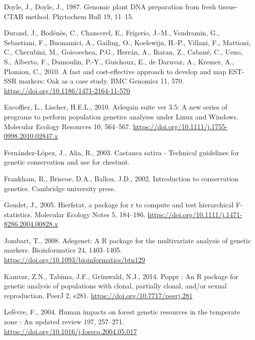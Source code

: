 \documentclass[12pt,a4paper,]{report}
\begin{document}
\leavevmode\hypertarget{ref-doyle1987genomic}{}%
Doyle, J., Doyle, J., 1987. Genomic plant DNA preparation from fresh
tissue-CTAB method. Phytochem Bull 19, 11--15.

\leavevmode\hypertarget{ref-durand_fast_2010}{}%
Durand, J., Bodénès, C., Chancerel, E., Frigerio, J.-M., Vendramin, G.,
Sebastiani, F., Buonamici, A., Gailing, O., Koelewijn, H.-P., Villani,
F., Mattioni, C., Cherubini, M., Goicoechea, P.G., Herrán, A., Ikaran,
Z., Cabané, C., Ueno, S., Alberto, F., Dumoulin, P.-Y., Guichoux, E., de
Daruvar, A., Kremer, A., Plomion, C., 2010. A fast and cost-effective
approach to develop and map EST-SSR markers: Oak as a case study. BMC
Genomics 11, 570. \url{https://doi.org/10.1186/1471-2164-11-570}

\leavevmode\hypertarget{ref-excoffier_arlequin_2010}{}%
Excoffier, L., Lischer, H.E.L., 2010. Arlequin suite ver 3.5: A new
series of programs to perform population genetics analyses under Linux
and Windows. Molecular Ecology Resources 10, 564--567.
\url{https://doi.org/10.1111/j.1755-0998.2010.02847.x}

\leavevmode\hypertarget{ref-fernandez-lopez_castanea_2003}{}%
Fernández-López, J., Alia, R., 2003. Castanea sativa - Technical
guidelines for genetic conservation and use for chestnut.

\leavevmode\hypertarget{ref-frankham_introduction_2002}{}%
Frankham, R., Briscoe, D.A., Ballou, J.D., 2002. Introduction to
conservation genetics. Cambridge university press.

\leavevmode\hypertarget{ref-goudet_hierfstat_2005}{}%
Goudet, J., 2005. Hierfstat, a package for r to compute and test
hierarchical F-statistics. Molecular Ecology Notes 5, 184--186.
\url{https://doi.org/10.1111/j.1471-8286.2004.00828.x}

\leavevmode\hypertarget{ref-Jombart2008}{}%
Jombart, T., 2008. Adegenet: A R package for the multivariate analysis
of genetic markers. Bioinformatics 24, 1403--1405.
\url{https://doi.org/10.1093/bioinformatics/btn129}

\leavevmode\hypertarget{ref-Kamvar2014}{}%
Kamvar, Z.N., Tabima, J.F., Grünwald, N.J., 2014. Poppr : An R package
for genetic analysis of populations with clonal, partially clonal,
and/or sexual reproduction. PeerJ 2, e281.
\url{https://doi.org/10.7717/peerj.281}

\leavevmode\hypertarget{ref-Lefevre2004}{}%
Lefèvre, F., 2004. Human impacts on forest genetic resources in the
temperate zone : An updated review 197, 257--271.
\url{https://doi.org/10.1016/j.foreco.2004.05.017}
\end{document}
